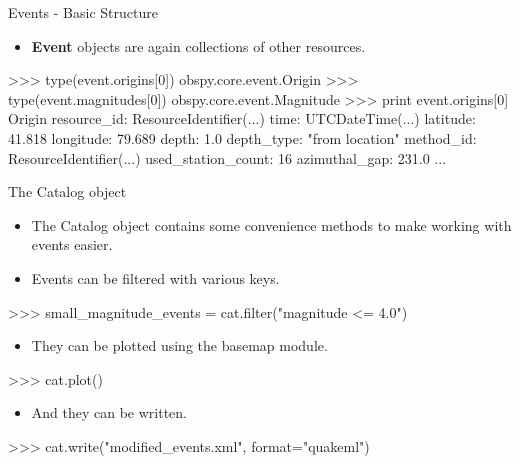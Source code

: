 \begin{frame}{Events - Basic Structure}
    \begin{itemize}
        \item \textbf{Event} objects are again collections of other resources.
    \end{itemize}
\begin{myColorBox}{0.95}{}
\begin{python}
>>> type(event.origins[0])
obspy.core.event.Origin
>>> type(event.magnitudes[0])
obspy.core.event.Magnitude
>>> print event.origins[0]
Origin
         resource_id: ResourceIdentifier(...)
                time: UTCDateTime(...)
            latitude: 41.818
           longitude: 79.689
               depth: 1.0
          depth_type: "from location"
           method_id: ResourceIdentifier(...)
  used_station_count: 16
       azimuthal_gap: 231.0
       ...
\end{python}
\end{myColorBox}
\end{frame}

\begin{frame}{The Catalog object}
    \begin{itemize}
        \item The Catalog object contains some convenience methods to make working with events easier.
        \item Events can be filtered with various keys.
    \end{itemize}
\begin{myColorBox}{0.95}{}
\begin{python}
>>> small_magnitude_events = cat.filter("magnitude <= 4.0")
\end{python}
\end{myColorBox}

    \begin{itemize}
        \item They can be plotted using the basemap module.
    \end{itemize}
\begin{myColorBox}{0.95}{}
\begin{python}
    >>> cat.plot()
\end{python}
\end{myColorBox}
    \begin{itemize}
        \item And they can be written.
    \end{itemize}
\begin{myColorBox}{0.95}{}
\begin{python}
>>> cat.write("modified_events.xml", format="quakeml")
\end{python}
\end{myColorBox}
\end{frame}


